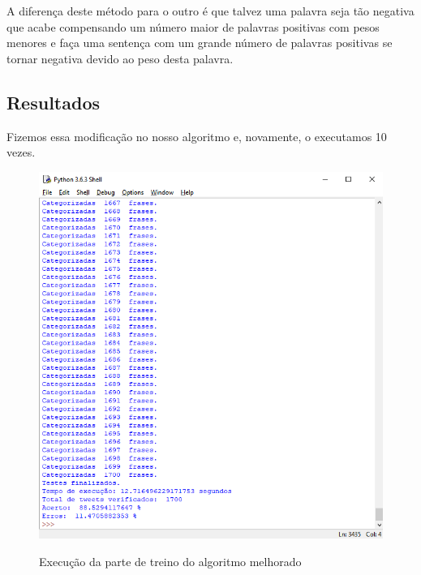 \documentclass[
article,			%
12pt,				%
a4paper,			%
english,			%
brazil,				%
sumario=tradicional,
twoside
]{abntex2}
\begin{document}
	A diferença deste método para o outro é que talvez uma palavra seja tão negativa que acabe compensando um número maior de palavras positivas com pesos menores e faça uma sentença com um grande número de palavras positivas se tornar negativa devido ao peso desta palavra.
	
	\subsection{Resultados}
	Fizemos essa modificação no nosso algoritmo e, novamente, o executamos 10 vezes.
	\begin{figure}[h!]
		\centering
		\caption{Execução da parte de treino do algoritmo melhorado}
		\includegraphics[scale=1]{melhoria1.png}
		\label{fig: melhoria1}
	\end{figure}
	
	\newpage
	\nocite{sitenaive}
	
	
	
\end{document}
